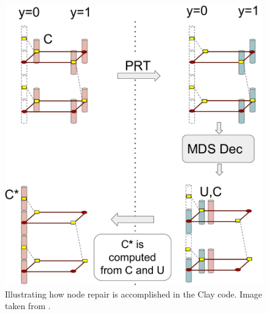   	\begin{figure}[h!]
  		\centering
  		\includegraphics[scale=.42]{src/Figures/chap4/repair_flow42}  
  		\caption{Illustrating how node repair is accomplished in the Clay code. Image taken from \cite{VajhaFAST18}.}  \label{fig:repair_flow42}    
  	\end{figure}

\newpage

